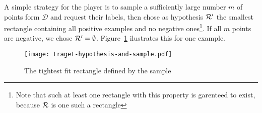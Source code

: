     A simple strategy for the player is to sample a sufficiently large number \(m\) of points form \(\mathcal{D}\) and request their labels, then chose as hypothesis \(\mathcal{R}^\prime\) the smallest rectangle containing all positive examples and no negative ones\footnote{Note that such at least one rectangle with this property is garenteed to exist, because \(\mathcal{R}\) is one such a rectangle}. If all \(m\) points are negative, we chose \(\mathcal{R}^\prime = \emptyset\). Figure~\ref{fig:traget-hypothesis-and-sample} ilustrates this for one example.

    \begin{figure}
        \begin{center}
            \texttt{[image: traget-hypothesis-and-sample.pdf]}
        \end{center}
        \caption{The tightest fit rectangle defined by the sample}
        \label{fig:traget-hypothesis-and-sample}
    \end{figure}

    